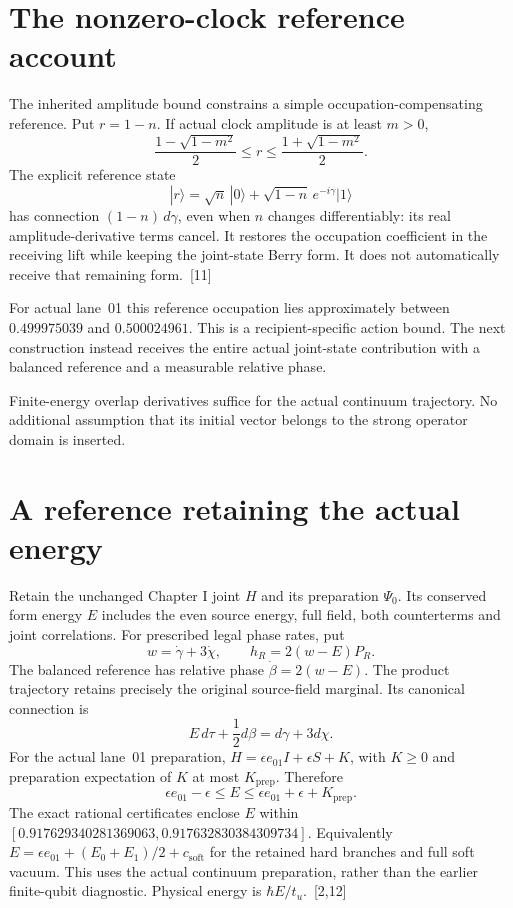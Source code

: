 \documentclass[10pt,twocolumn,letterpaper]{article}
\begin{document}
\section{The nonzero-clock reference account}
The inherited amplitude bound constrains a simple occupation-compensating reference. Put $r=1-n$. If actual clock amplitude is at least $m>0$,
\[
\frac{1-\sqrt{1-m^2}}2\leq r\leq\frac{1+\sqrt{1-m^2}}2.
\]
The explicit reference state
\[
|r\rangle=\sqrt n\,|0\rangle+\sqrt{1-n}\,e^{-i\gamma}|1\rangle
\]
has connection $(1-n)\,d\gamma$, even when $n$ changes differentiably: its real amplitude-derivative terms cancel. It restores the occupation coefficient in the receiving lift while keeping the joint-state Berry form. It does not automatically receive that remaining form.~[11]

For actual lane~01 this reference occupation lies approximately between $0.499975039$ and $0.500024961$. This is a recipient-specific action bound. The next construction instead receives the entire actual joint-state contribution with a balanced reference and a measurable relative phase.

Finite-energy overlap derivatives suffice for the actual continuum trajectory. No additional assumption that its initial vector belongs to the strong operator domain is inserted.

\section{A reference retaining the actual energy}
Retain the unchanged Chapter I joint $H$ and its preparation $\Psi_0$. Its conserved form energy $E$ includes the even source energy, full field, both counterterms and joint correlations. For prescribed legal phase rates, put
\[
w=\dot\gamma+3\dot\chi,\qquad h_R=2(w-E)P_R.
\]
The balanced reference has relative phase $\dot\beta=2(w-E)$. The product trajectory retains precisely the original source-field marginal. Its canonical connection is
\[
E\,d\tau+\frac12d\beta=d\gamma+3d\chi.
\]
For the actual lane~01 preparation, $H=\epsilon e_{01}I+\epsilon S+K$, with $K\geq0$ and preparation expectation of $K$ at most $K_{\mathrm{prep}}$. Therefore
\[
\epsilon e_{01}-\epsilon\leq E\leq\epsilon e_{01}+\epsilon+K_{\mathrm{prep}}.
\]
The exact rational certificates enclose $E$ within $[0.917629340281369063,\allowbreak 0.917632830384309734]$. Equivalently $E=\epsilon e_{01}+(E_0+E_1)/2+c_{\mathrm{soft}}$ for the retained hard branches and full soft vacuum. This uses the actual continuum preparation, rather than the earlier finite-qubit diagnostic. Physical energy is $\hbar E/t_u$.~[2,12]
\end{document}
